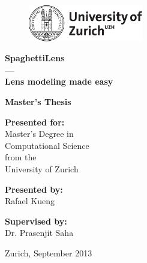\begin{figure}[th]
		\includegraphics[width=5cm]{pic/uzh}
	\label{fig:logo}
\end{figure}

\begin{center}

\vspace{1cm}


{\Huge\bf SpaghettiLens\\}
\vspace{0.5cm}
{\Huge\bf ---\\}
\vspace{0.5cm}
{\Huge\bf Lens modeling made easy}

\vspace{3cm}

{\Large\bf Master's Thesis}

\vspace{1cm}

{\Large\bf Presented for:\\}
{\Large Master's Degree in\\}
{\Large Computational Science\\}
{\Large from the\\}
{\Large University of Zurich\\}

\vspace{1cm}

{\Large\bf Presented by:\\}
{\Large Rafael Kueng\\}

\vspace{1cm}

{\Large\bf Supervised by:\\}
{\Large Dr. Prasenjit Saha\\}


\vspace{1cm}

{\Large Zurich, September 2013} 

\end{center}
\newpage